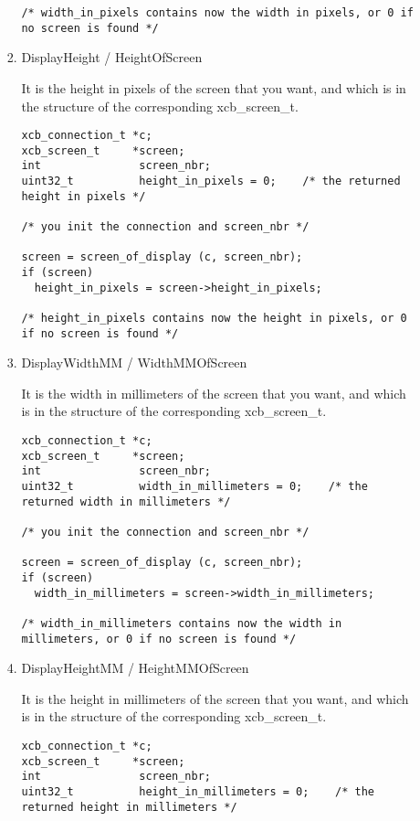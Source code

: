 \documentclass[12pt,oneside,titlepage]{book}
\begin{document}
\begin{enumerate}
\begin{enumerate}
\begin{enumerate}
\begin{verbatim}
/* width_in_pixels contains now the width in pixels, or 0 if no screen is found */
\end{verbatim}
    \item
      \protect\hypertarget{DisplayHeight}{}{DisplayHeight /
      HeightOfScreen}

      It is the height in pixels of the screen that you want, and which
      is in the structure of the corresponding {xcb\_screen\_t}.

\begin{verbatim}
xcb_connection_t *c;
xcb_screen_t     *screen;
int               screen_nbr;
uint32_t          height_in_pixels = 0;    /* the returned height in pixels */

/* you init the connection and screen_nbr */

screen = screen_of_display (c, screen_nbr);
if (screen)
  height_in_pixels = screen->height_in_pixels;

/* height_in_pixels contains now the height in pixels, or 0 if no screen is found */
\end{verbatim}
    \item
      \protect\hypertarget{DisplayWidthMM}{}{DisplayWidthMM /
      WidthMMOfScreen}

      It is the width in millimeters of the screen that you want, and
      which is in the structure of the corresponding {xcb\_screen\_t}.

\begin{verbatim}
xcb_connection_t *c;
xcb_screen_t     *screen;
int               screen_nbr;
uint32_t          width_in_millimeters = 0;    /* the returned width in millimeters */

/* you init the connection and screen_nbr */

screen = screen_of_display (c, screen_nbr);
if (screen)
  width_in_millimeters = screen->width_in_millimeters;

/* width_in_millimeters contains now the width in millimeters, or 0 if no screen is found */
\end{verbatim}
    \item
      \protect\hypertarget{DisplayHeightMM}{}{DisplayHeightMM /
      HeightMMOfScreen}

      It is the height in millimeters of the screen that you want, and
      which is in the structure of the corresponding {xcb\_screen\_t}.

\begin{verbatim}
xcb_connection_t *c;
xcb_screen_t     *screen;
int               screen_nbr;
uint32_t          height_in_millimeters = 0;    /* the returned height in millimeters */


\end{verbatim}
\end{enumerate}
\end{enumerate}
\end{enumerate}
\end{document}
